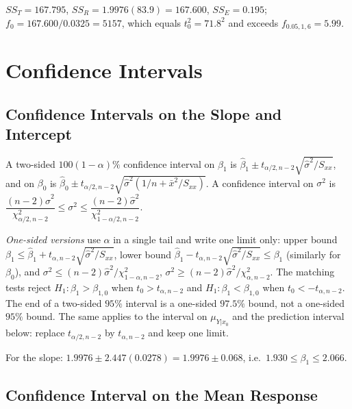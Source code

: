 \begin{example}
$SS_T=167.795$, $SS_R=1.9976(83.9)=167.600$, $SS_E=0.195$; $f_0=167.600/0.0325=5157$, which equals $t_0^2=71.8^2$ and exceeds $f_{0.05,1,6}=5.99$.
\end{example}

\section{Confidence Intervals}

\subsection{Confidence Intervals on the Slope and Intercept}

\begin{theorem}\label{thm:regci}
A two-sided $100(1-\alpha)\%$ confidence interval on $\beta_1$ is $\hat\beta_1\pm t_{\alpha/2,n-2}\sqrt{\hat\sigma^2/S_{xx}}$, and on $\beta_0$ is $\hat\beta_0\pm t_{\alpha/2,n-2}\sqrt{\hat\sigma^2(1/n+\bar{x}^2/S_{xx})}$. A confidence interval on $\sigma^2$ is $\dfrac{(n-2)\hat\sigma^2}{\chi^2_{\alpha/2,n-2}}\le\sigma^2\le\dfrac{(n-2)\hat\sigma^2}{\chi^2_{1-\alpha/2,n-2}}$.

\emph{One-sided versions} use $\alpha$ in a single tail and write one limit only: upper bound $\beta_1\le\hat\beta_1+t_{\alpha,n-2}\sqrt{\hat\sigma^2/S_{xx}}$, lower bound $\hat\beta_1-t_{\alpha,n-2}\sqrt{\hat\sigma^2/S_{xx}}\le\beta_1$ (similarly for $\beta_0$), and $\sigma^2\le(n-2)\hat\sigma^2/\chi^2_{1-\alpha,n-2}$, $\sigma^2\ge(n-2)\hat\sigma^2/\chi^2_{\alpha,n-2}$. The matching tests reject $H_1:\beta_1>\beta_{1,0}$ when $t_0>t_{\alpha,n-2}$ and $H_1:\beta_1<\beta_{1,0}$ when $t_0<-t_{\alpha,n-2}$. The end of a two-sided $95\%$ interval is a one-sided $97.5\%$ bound, not a one-sided $95\%$ bound. The same applies to the interval on $\mu_{Y|x_0}$ and the prediction interval below: replace $t_{\alpha/2,n-2}$ by $t_{\alpha,n-2}$ and keep one limit.
\end{theorem}

\begin{example}
For the slope: $1.9976\pm2.447(0.0278)=1.9976\pm0.068$, i.e.\ $1.930\le\beta_1\le2.066$.
\end{example}

\subsection{Confidence Interval on the Mean Response}

